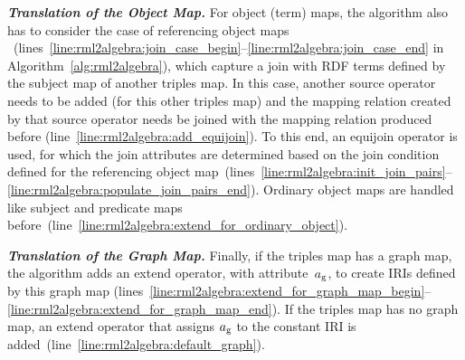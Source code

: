 \enlargethispage{\baselineskip}%
\vspace{-1mm} %

\smallskip\noindent\textbf{\itshape Translation of the Object Map.}
For object (term) maps, the algorithm also has to consider the case of
	referencing object maps%
~(lines~\ref{line:rml2algebra:join_case_begin}--\ref{line:rml2algebra:join_case_end} in Algorithm~\ref{alg:rml2algebra}), which capture a join with
	RDF terms defined by the subject map
of another triples map. In this case, another source operator needs to be added
	(for this other triples map)
and
	the mapping relation created by that source operator needs
be joined with the mapping relation produced before (line~\ref{line:rml2algebra:add_equijoin}). To this end, an equijoin operator is used, for which the join attributes are determined based on the join condition defined for the referencing object map~(lines~\ref{line:rml2algebra:init_join_pairs}--\ref{line:rml2algebra:populate_join_pairs_end}).
%
Ordinary object maps are handled
	like
subject
and predicate maps before~(line~\ref{line:rml2algebra:extend_for_ordinary_object}).


\smallskip\noindent\textbf{\itshape Translation of the Graph Map.}
Finally, if the triples map has a graph map, the algorithm adds an extend operator, with attribute~$a_\textrm{g}$, to create IRIs defined by this graph map (lines~\ref{line:rml2algebra:extend_for_graph_map_begin}--\ref{line:rml2algebra:extend_for_graph_map_end}). If the triples map
	has no
graph map, an extend operator that assigns $a_\textrm{g}$ to the constant IRI  is added~(line~\ref{line:rml2algebra:default_graph}).

